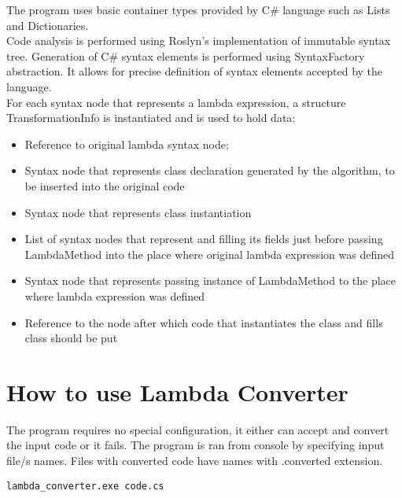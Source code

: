 \documentclass[]{report}
\begin{document}
    The program uses basic container types provided by C\# language such as Lists and Dictionaries. \\Code analysis is performed using Roslyn's implementation of immutable syntax tree. Generation of C\# syntax elements is performed using SyntaxFactory\cite{syntaxFactory} abstraction. It allows for precise definition of syntax elements accepted by the language. 
    \\    For each syntax node that represents a lambda expression, a structure TransformationInfo is instantiated and is used to hold data: 
    \begin{itemize}
    \item Reference to original lambda syntax node;
    \item Syntax node that represents class declaration generated by the algorithm, to be inserted into the original code
    \item Syntax node that represents class instantiation 
    \item List of syntax nodes that represent and filling its fields just before passing LambdaMethod into the place where original lambda expression was defined
    \item Syntax node that represents passing instance of LambdaMethod to the place where lambda expression was defined
    \item Reference to the node after which code that instantiates the class and fills class should be put
    \end{itemize}
    
    
    \section{How to use Lambda Converter}
    The program requires no special configuration, it either can accept and convert the input code or it fails. The program is ran from console by specifying input file/s names. Files with converted code have names with .converted extension.
    
    \begin{lstlisting}[caption={Example of invocation of LambdaConverter. Input code is present in code.cs file. The output will be stored in code.cs.converted file}]
    lambda_converter.exe code.cs
    \end{lstlisting}
\end{document}
